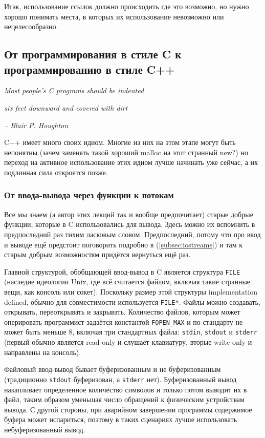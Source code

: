 \documentclass[a4paper,12pt,oneside]{article}
\begin{document}
Итак, использование ссылок должно происходить где это возможно, но нужно хорошо понимать места, в которых их использование невозможно или нецелесообразно.

\pagebreak
\subsection{От программирования в стиле C к программированию в стиле C++}

\hfill\textit{Most people's C programs should be indented}

\hfill\textit{six feet downward and covered with dirt}{\vspace{0.5em}}

\hfill\textit{-- Blair P. Houghton}

C++ имеет много своих идиом. Многие из них на этом этапе могут быть непонятны (зачем заменять такой хороший malloc на этот странный new?) но переход на активное использование этих идиом лучше начинать уже сейчас, а их подлинная сила откроется позже.

\subsubsection{От ввода-вывода через функции к потокам}\label{PrintfToCout}

Все мы знаем (а автор этих лекций так и вообще предпочитает) старые добрые функции, которые в C использовались для вывода. Здесь можно их вспомнить в предпоследний раз тихим ласковым словом. Предпоследний, потому что про ввод и выводе ещё предстоит поговорить подробно в (\ref{subsec:iostreams}) и там к старым добрым возможностям придётся вернуться ещё раз.

Главной структурой, обобщающей ввод-вывод в C является структура \lstinline!FILE! (наследие идеологии Unix, где всё считается файлом, включая такие странные вещи, как консоль или сокет). Поскольку размер этой структуры implementation defined, обычно для совместимости используется \lstinline!FILE*!. Файлы можно создавать, открывать, переоткрывать и закрывать. Количество файлов, которым может оперировать программист задаётся константой \lstinline!FOPEN_MAX! и по стандарту не может быть меньше 8, включая три стандартных файла: \lstinline!stdin!, \lstinline!stdout! и \lstinline!stderr! (первый обычно является read-only и слушает клавиатуру, вторые write-only и направлены на консоль).

Файловый ввод-вывод бывает буферизованным и не буферизованным (традиционно \lstinline!stdout! буферизован, а \lstinline!stderr! нет). Буферизованный вывод накапливает определенное количество символов и только потом выводит их в файл, таким образом уменьшая число обращений к физическим устройствам вывода. С другой стороны, при аварийном завершении программы содержимое буфера может испариться, поэтому в таких сценариях лучше использовать небуферизованный вывод.
\end{document}
